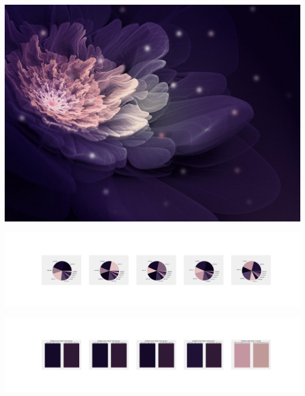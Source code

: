 \documentclass[11pt]{article}
\begin{document}
\begin{landscape}
    \begin{center}
    \includegraphics[width=\textwidth]{./nbimg/file (144).jpg}
    \end{center}

    \begin{center}
    \includegraphics[width=250mm]{./nbimg/pie-50.jpg}
    \end{center}

    \begin{center}
    \includegraphics[width=250mm]{./nbimg/peak-50.jpg}
    \end{center}
    


\end{landscape}
\end{document}
